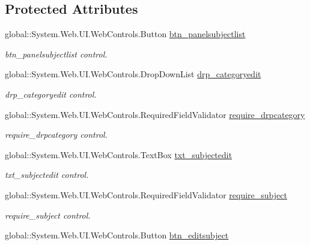 \subsection*{Protected Attributes}
\begin{DoxyCompactItemize}
\item 
global\+::\+System.\+Web.\+U\+I.\+Web\+Controls.\+Button \mbox{\hyperlink{class_admin__editsubject_a55f0496f3ffe95f8f48d117d56d1908a}{btn\+\_\+panelsubjectlist}}
\begin{DoxyCompactList}\small\item\em btn\+\_\+panelsubjectlist control. \end{DoxyCompactList}\item 
global\+::\+System.\+Web.\+U\+I.\+Web\+Controls.\+Drop\+Down\+List \mbox{\hyperlink{class_admin__editsubject_a1bf202806a0f9ce75581ef065ebc9494}{drp\+\_\+categoryedit}}
\begin{DoxyCompactList}\small\item\em drp\+\_\+categoryedit control. \end{DoxyCompactList}\item 
global\+::\+System.\+Web.\+U\+I.\+Web\+Controls.\+Required\+Field\+Validator \mbox{\hyperlink{class_admin__editsubject_ac0e8b53b23e0729fe4b9ee3811d47ca6}{require\+\_\+drpcategory}}
\begin{DoxyCompactList}\small\item\em require\+\_\+drpcategory control. \end{DoxyCompactList}\item 
global\+::\+System.\+Web.\+U\+I.\+Web\+Controls.\+Text\+Box \mbox{\hyperlink{class_admin__editsubject_a21358ba782f78c4f975761ab95999883}{txt\+\_\+subjectedit}}
\begin{DoxyCompactList}\small\item\em txt\+\_\+subjectedit control. \end{DoxyCompactList}\item 
global\+::\+System.\+Web.\+U\+I.\+Web\+Controls.\+Required\+Field\+Validator \mbox{\hyperlink{class_admin__editsubject_a7fb5ee6d2f128bce89d7932269c22a21}{require\+\_\+subject}}
\begin{DoxyCompactList}\small\item\em require\+\_\+subject control. \end{DoxyCompactList}\item 
global\+::\+System.\+Web.\+U\+I.\+Web\+Controls.\+Button \mbox{\hyperlink{class_admin__editsubject_aa9712a3ce6855a9762d7bd17e99f1314}{btn\+\_\+editsubject}}

\end{DoxyCompactItemize}
